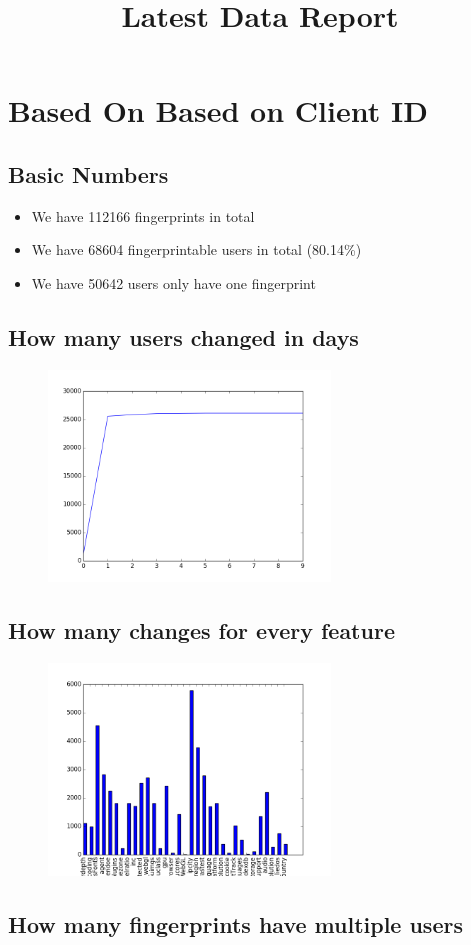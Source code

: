 \documentclass[10pt, conference, compsocconf]{IEEEtran}
\begin{document}
\title{Latest Data Report}
\author{
}
\maketitle
\section{Based On Based on Client ID}
\subsection{Basic Numbers}
\begin{itemize}\item We have 112166 fingerprints in total\item We have 68604 fingerprintable users in total (80.14\%)\item We have 50642 users only have one fingerprint \end{itemize}\subsection{How many users changed in days}
\begin{figure}[H]\centering\includegraphics[width=75mm,scale=0.5]{BasedonClientIDchangebytime}\end{figure}\subsection{How many changes for every feature}
\begin{figure}[H]\centering\includegraphics[width=75mm,scale=0.5]{BasedonClientIDfeaturechange}\end{figure}\subsection{How many fingerprints have multiple users}
\end{document}
